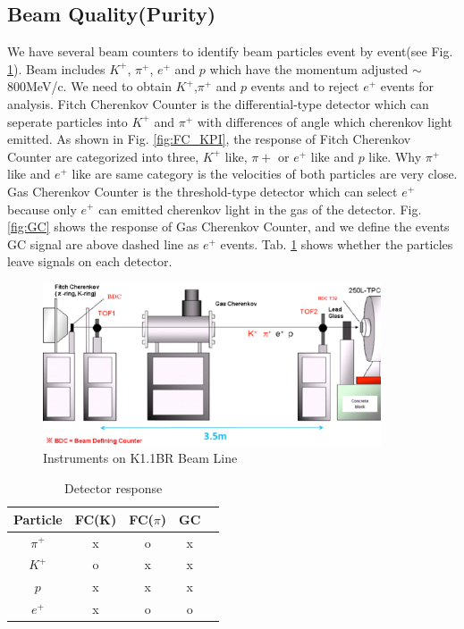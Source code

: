 \subsection{Beam Quality(Purity)}

We have several beam counters to identify beam particles event by event(see Fig. \ref{fig:Beamline}).
Beam includes $K^{+}$, $\pi^{+}$, $e^{+}$ and $p$ which have the momentum adjusted $\sim$800MeV/c.
We need to obtain $K^{+}$,$\pi^{+}$ and $p$ events and to reject $e^{+}$ events for analysis.
Fitch Cherenkov Counter is the differential-type detector which can seperate particles into $K^{+}$ and $\pi^{+}$ with differences of angle which cherenkov light emitted.
As shown in Fig. \ref{fig:FC_KPI}, the response of Fitch Cherenkov Counter are categorized into three, $K^{+}$ like, $\pi{+}$ or $e^{+}$ like and $p$ like.
Why $\pi^{+}$ like and $e^{+}$ like are same category is the velocities of both particles are very close.
Gas Cherenkov Counter is the threshold-type detector which can select $e^{+}$ because only $e^{+}$ can emitted cherenkov light in the gas of the detector.
Fig. \ref{fig:GC} shows the response of Gas Cherenkov Counter, and we define the events GC signal are above dashed line as $e^{+}$ events.
Tab. \ref{tb:Summary} shows whether the particles leave signals on each detector.\\

\begin{figure}[htbp]
  \centering
  \includegraphics[width=10cm,clip]{fig/Beamline.eps}
  \caption{Instruments on K1.1BR Beam Line}
  \label{fig:Beamline}
\end{figure}

\begin{table}
  \centering
  \caption{Detector response}
  \begin{tabular}[htb]{c|cccc} \hline
    Particle  & FC(K) & FC($\pi$) & GC \\ \hline
    $\pi^{+}$ & x     & o         & x  \\
    $K^{+}$   & o     & x         & x  \\ 
    $p$       & x     & x         & x  \\ 
    $e^{+}$   & x     & o         & o  \\ \hline
  \end{tabular}
  \label{tb:Summary}
\end{table}

